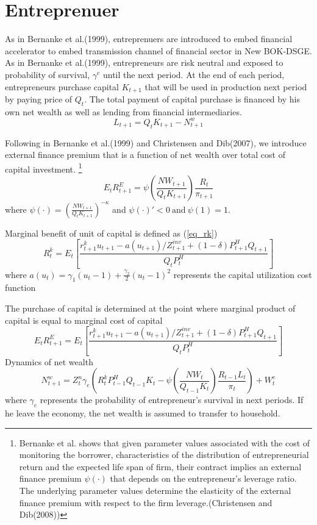 \documentclass[11pt, a4paper]{article}
\begin{document}
\section{Entreprenuer}


 As in Bernanke et al.(1999), entreprenuers are introduced to embed financial accelerator to embed  transmission channel of financial sector in New BOK-DSGE. As in Bernanke et al.(1999), entrepreneurs are risk neutral and exposed to probability of survival, $\gamma^e$ until the next period.
 At the end of each period, entrepreneurs purchase capital $K_{t+1}$ that will be used in production next period by paying price of $Q_t$. The total payment of capital purchase is financed by his own net wealth as well as lending from financial intermediaries.
 \[L_{t+1} = Q_tK_{t+1} - N_{t+1}^w\]
  
 Following in Bernanke et al.(1999) and Christensen and Dib(2007), we introduce external finance premium that is a function of net wealth over total cost of capital investment. \footnote{Bernanke et al. shows that given parameter values associated with the cost of monitoring the borrower, characteristics of the distribution of entrepreneurial return and the expected life span of firm, their contract implies an external finance premium $\psi(\cdot )$ that depends on the entrepreneur's leverage ratio. The underlying parameter values determine the elasticity of the external finance premium with respect to the firm leverage.(Christensen and Dib(2008))}
  \begin{equation}
E_t  R_{t+1}^E = \psi\left( \frac{NW_{t+1}}{Q_t K_{t+1}} \right) \frac{R_t}{\pi_{t+1}}
  \end{equation}
  where $\psi\left( \cdot \right) = \left( \frac{NW_{t+1}}{Q_t K_{t+1}} \right)^{-\kappa}$ and $\psi(\cdot)'<0~ \text{and}~ \psi(1)=1$.
  
  Marginal benefit of unit of capital is defined as (\ref{eq_rk})
  \begin{equation}
  R_t^k = E_t \left[\frac{r_{t+1}^k u_{t+1} - a(u_{t+1})/Z_{t+1}^{inv}+ (1-\delta)P_{t+1}^H Q_{t+1}}{Q_t P_t^H} \right]
  \label{eq_rk}\end{equation}
  where $a(u_t)= \gamma_1(u_t -1) + \frac{\gamma_2}{2}(u_t -1)^2$ represents the capital utilization cost function
  
   The purchase of capital is determined at the point where marginal product of capital is equal to marginal cost of capital \[E_t R_{t+1}^E = E_t \left[\frac{r_{t+1}^k u_{t+1} - a(u_{t+1})/Z_{t+1}^{inv}+ (1-\delta)P_{t+1}^H Q_{t+1}}{Q_t P_t^H} \right] \] 
 Dynamics of net wealth 
    \begin{equation}
    N^w_{t+1} = Z_t^n \gamma_e\left(R_t^k P_{t-1} ^H Q_{t-1} K_t   - \psi\left(\frac{NW_t}{Q_{t-1} K_t} \right)\frac{R_{t-1} L_t}{\pi_t}  \right) + W_t^e
    \end{equation}
where $\gamma_e$ represents the probability of entrepreneur's survival in next periods. If he leave the economy, the net wealth is assumed to transfer to household. 
~\\
\end{document}
